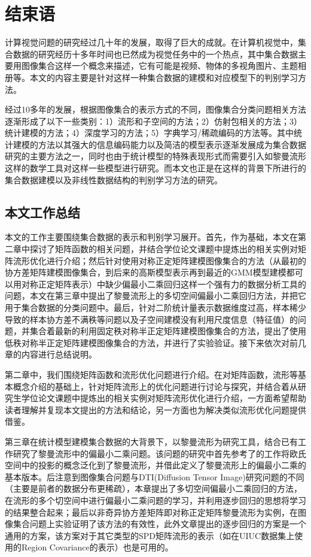 \chapter{结束语}
\label{chap:The_End}
计算视觉问题的研究经过几十年的发展，取得了巨大的成就。在计算机视觉中，集合数据的研究经历十多年时间也已然成为视觉任务中的一个热点，其中集合数据主要用图像集合这样一个概念来描述，它有可能是视频、物体的多视角图片、主题相册等。本文的内容主要是针对这样一种集合数据的建模和对应模型下的判别学习方法。

经过10多年的发展，根据图像集合的表示方式的不同，图像集合分类问题相关方法逐渐形成了以下一些类别：1）流形和子空间的方法；2）仿射包相关的方法；3）统计建模的方法；4）深度学习的方法；5）字典学习/稀疏编码的方法等。其中统计建模的方法以其强大的信息编码能力以及简洁的模型表示逐渐发展成为集合数据研究的主要方法之一，同时也由于统计模型的特殊表现形式而需要引入如黎曼流形这样的数学工具对这样一些模型进行研究。而本文也正是在这样的背景下所进行的集合数据建模以及非线性数据结构的判别学习方法的研究。
\section{本文工作总结}
\label{sec:Conclusion}
本文的工作主要围绕集合数据的表示和判别学习展开。首先，作为基础，本文在第二章中探讨了矩阵函数的相关问题，并结合学位论文课题中提炼出的相关实例对矩阵流形优化进行介绍；然后针对使用对称正定矩阵建模图像集合的方法（从最初的协方差矩阵建模图像集合，到后来的高斯模型表示再到最近的GMM模型建模都可以用对称正定矩阵表示）中缺少偏最小二乘回归这样一个强有力的数据分析工具的问题，本文在第三章中提出了黎曼流形上的多切空间偏最小二乘回归方法，并把它用于集合数据的分类问题中。最后，针对二阶统计量表示数据维度过高，样本稀少导致的样本协方差不满秩等问题以及子空间建模没有利用尺度信息（特征值）的问题，并集合着最新的利用固定秩对称半正定矩阵建模图像集合的方法，提出了使用低秩对称半正定矩阵建模图像集合的方法，并进行了实验验证。接下来依次对前几章的内容进行总结说明。

第二章中，我们围绕矩阵函数和流形优化问题进行介绍。在对矩阵函数，流形等基本概念介绍的基础上，针对矩阵流形上的优化问题进行讨论与探究，并结合着从研究生学位论文课题中提炼出的相关实例对矩阵流形优化进行介绍，一方面希望帮助读者理解并复现本文提出的方法和结论，另一方面也为解决类似流形优化问题提供借鉴。

第三章在统计模型建模集合数据的大背景下，以黎曼流形为研究工具，结合已有工作\cite{PGA,RCCA}研究了黎曼流形中的偏最小二乘问题。该问题的研究中首先参考了\cite{PGA,RCCA}的工作将欧氏空间中的投影的概念泛化到了黎曼流形，并借此定义了黎曼流形上的偏最小二乘的基本版本。后注意到图像集合问题与DTI(Diffusion Tensor Image)研究问题的不同（主要是前者的数据分布更稀疏），本章提出了多切空间偏最小二乘回归的方法，在流形的多个切空间中进行偏最小二乘问题的学习，并利用逐步回归的思想将学习的结果整合起来；最后以非奇异协方差矩阵即对称正定矩阵黎曼流形为实例，在图像集合问题上实验证明了该方法的有效性，此外文章提出的逐步回归的方案是一个通用的方案，该方案对于其它类型的SPD矩阵流形的表示（如在UIUC\cite{Database_UIUC}数据集上使用的Region Covariance的表示）也是可用的。

